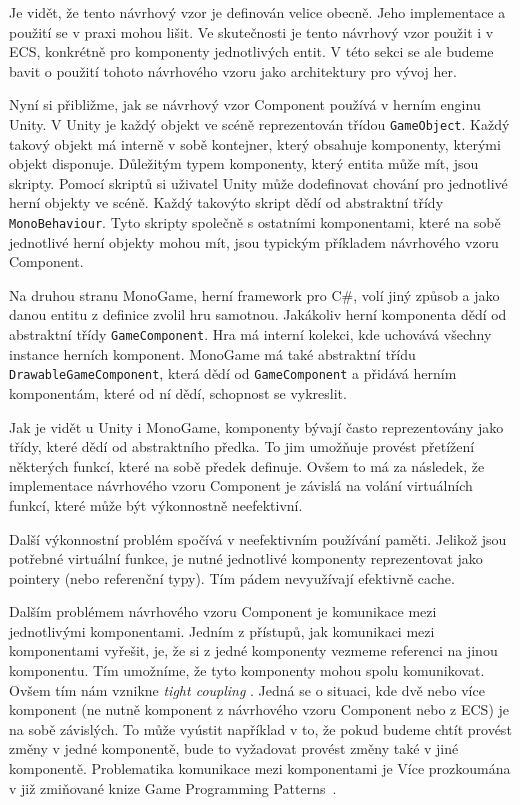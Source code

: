 
Je vidět, že tento návrhový vzor je definován velice obecně. Jeho implementace a použití se v praxi mohou lišit. Ve skutečnosti je tento návrhový vzor použit i v ECS, konkrétně pro komponenty jednotlivých entit. V této sekci se ale budeme bavit o použití tohoto návrhového vzoru jako architektury pro vývoj her.

Nyní si přibližme, jak se návrhový vzor Component používá v herním enginu Unity. V Unity je každý objekt ve scéně reprezentován třídou \verb|GameObject|. Každý takový objekt má interně v sobě kontejner, který obsahuje komponenty, kterými objekt disponuje. Důležitým typem komponenty, který entita může mít, jsou skripty. Pomocí skriptů si uživatel Unity může dodefinovat chování pro jednotlivé herní objekty ve scéně. Každý takovýto skript dědí od abstraktní třídy \verb|MonoBehaviour|. Tyto skripty společně s ostatními komponentami, které na sobě jednotlivé herní objekty mohou mít, jsou typickým příkladem návrhového vzoru Component.

Na druhou stranu MonoGame, herní framework pro C\#, volí jiný způsob a jako danou entitu z definice zvolil hru samotnou. Jakákoliv herní komponenta dědí od abstraktní třídy \verb|GameComponent|. Hra má interní kolekci, kde uchovává všechny instance herních komponent. MonoGame má také abstraktní třídu \verb|DrawableGameComponent|, která dědí od \verb|GameComponent| a přidává herním komponentám, které od ní dědí, schopnost se vykreslit.

Jak je vidět u Unity i MonoGame, komponenty bývají často reprezentovány jako třídy, které dědí od abstraktního předka. To jim umožňuje provést přetížení některých funkcí, které na sobě předek definuje. Ovšem to má za následek, že implementace návrhového vzoru Component je závislá na volání virtuálních funkcí, které může být výkonnostně neefektivní.

Další výkonnostní problém spočívá v neefektivním používání paměti. Jelikož jsou potřebné virtuální funkce, je nutné jednotlivé komponenty reprezentovat jako pointery (nebo referenční typy). Tím pádem nevyužívají efektivně cache.

Dalším problémem návrhového vzoru Component je komunikace mezi jednotlivými komponentami. Jedním z přístupů, jak komunikaci mezi komponentami vyřešit, je, že si z jedné komponenty vezmeme referenci na jinou komponentu. Tím umožníme, že tyto komponenty mohou spolu komunikovat. Ovšem tím nám vznikne \textit{tight coupling} . Jedná se o situaci, kde dvě nebo více komponent (ne nutně komponent z návrhového vzoru Component nebo z ECS) je na sobě závislých. To může vyústit například v to, že pokud budeme chtít provést změny v jedné komponentě, bude to vyžadovat provést změny také v jiné komponentě. Problematika komunikace mezi komponentami je Více prozkoumána v již zmiňované knize Game Programming Patterns~\cite{nystrom2014game}.


